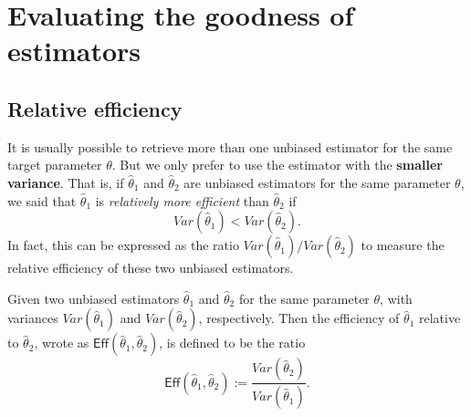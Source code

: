 \chapter{Evaluating the goodness of estimators}

\section{Relative efficiency}

It is usually possible to retrieve more than one unbiased estimator for the same target 
parameter $\theta$. But we only prefer to use the estimator with the 
\textbf{smaller variance}. That is, if $\widehat{\theta}_1$ and $\widehat{\theta}_2$ are 
unbiased estimators for the same parameter $\theta$, we said that 
$\widehat{\theta}_1$ is \textit{relatively more efficient} than $\widehat{\theta}_2$ 
if 
\[
    Var(\widehat{\theta}_1) < Var(\widehat{\theta}_2). 
\]
In fact, this can be expressed as the ratio $ Var(\widehat{\theta}_1) / Var(\widehat{\theta}_2)$
to measure the relative efficiency of these two unbiased estimators.

\begin{definition}
    Given two unbiased estimators $\widehat{\theta}_1$ and $\widehat{\theta}_2$ for the 
    same parameter $\theta$, with variances $Var(\widehat{\theta}_1)$ and $Var(\widehat{\theta}_2)$,
    respectively. Then the efficiency of $\widehat{\theta}_1$ relative to $\widehat{\theta}_2$, 
    wrote as $\textsf{Eff}(\widehat{\theta}_1, \widehat{\theta}_2)$, is defined to be the ratio
    \begin{equation}
        \textsf{Eff}(\widehat{\theta}_1, \widehat{\theta}_2) := \frac{Var(\widehat{\theta}_2)}{Var(\widehat{\theta}_1)}.
    \end{equation}
\end{definition}

